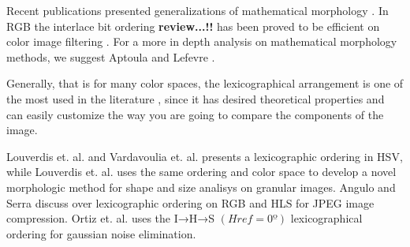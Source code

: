Recent publications presented generalizations of mathematical morphology \cite{ledoux2012limits, van2013group, velasco2012random, lezoray2009learning, velasco2010morphological, burgeth2013morphology, velasco2011supervised, hanbury2001morphological, angulo2010pseudo, aptoula2008alpha, kleefeld2015processing, vazquez2014color}. In RGB the interlace bit ordering \textbf{review...!!} has been proved to be efficient on color image filtering \cite{chanussot1997bit}. For a more in depth analysis on mathematical morphology methods, we suggest Aptoula and Lefevre \cite{apatoula2007comparative}.



Generally, that is for many color spaces, the lexicographical arrangement is one of the most used in the literature \cite{aptoula2007comparative, aptoula2008lexicographical}, since it has desired theoretical properties and can easily customize the way you are going to compare the components of the image. 


Louverdis et. al. \cite{louverdis2002new} and Vardavoulia et. al. \cite{vardavoulia2002vector} presents a lexicographic ordering in HSV, while Louverdis et. al. \cite{louverdis2002morphological} uses the same ordering and color space to develop a novel morphologic method for shape and size analisys on granular images. Angulo and Serra \cite{angulo2003morphological} discuss over lexicographic ordering on RGB and HLS for JPEG image compression. Ortiz et. al. \cite{ortiz2004morphological} uses the I→H→S $(Href=0º)$ lexicographical ordering for gaussian noise elimination.

